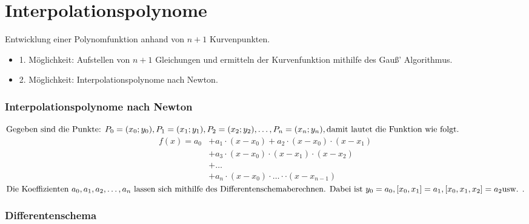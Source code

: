 \section{Interpolationspolynome}
Entwicklung einer Polynomfunktion anhand von \(n+1\) Kurvenpunkten.
\begin{itemize}
 \item 1. Möglichkeit: Aufstellen von $n+1$ Gleichungen und ermitteln der Kurvenfunktion mithilfe des Gauß' Algorithmus.
 \item 2. Möglichkeit: Interpolationspolynome nach Newton.
\end{itemize}

\subsubsection{Interpolationspolynome nach Newton}
\(\text{Gegeben sind die Punkte: } \\ P_0=(x_0;y_0), P_1=(x_1;y_1), P_2=(x_2;y_2), \ldots, P_n=(x_n;y_n), \\ \text{damit lautet die Funktion wie folgt.}\)
\begin{align*}
 f(x)=a_0&+a_1\cdot (x-x_0)+ a_2\cdot (x-x_0)\cdot(x-x_1)\\
	 &+a_3\cdot(x-x_0)\cdot(x-x_1)\cdot(x-x_2)\\
	 &+\ldots\\
	 &+a_n\cdot(x-x_0)\cdot\ldots\cdot\cdot(x-x_{n-1})
\end{align*}
\( \text{Die Koeffizienten } a_0, a_1, a_2,\ldots, a_n \text{ lassen sich mithilfe des Differentenschema} \\ \text{berechnen. Dabei ist } y_0=a_0, [x_0,x_1]=a_1, [x_0,x_1,x_2]=a_2 \text{usw. .}\) 

\subsubsection{Differentenschema}

